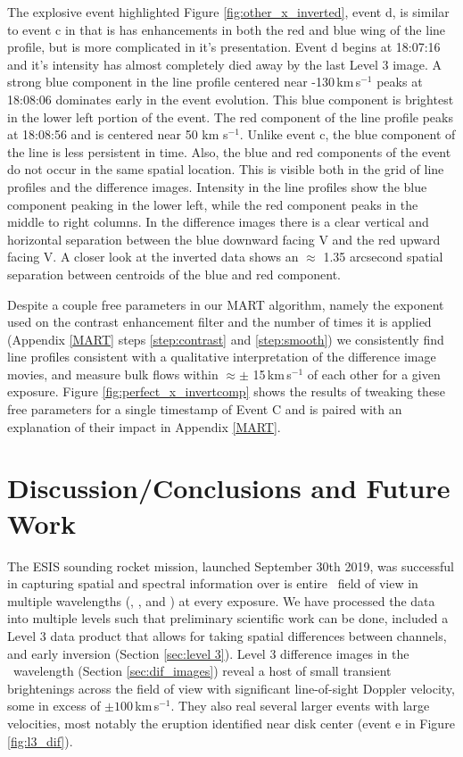 		The explosive event highlighted Figure \ref{fig:other_x_inverted}, event d, is similar to event c in that is has enhancements in both the red and blue wing of the line profile, but is more complicated in it's presentation.
		Event d  begins at 18:07:16 and it's intensity has almost completely died away by the last Level 3 image.
		A strong blue component in the line profile centered near -130\,km\,s$^{-1}$  peaks at 18:08:06 dominates early in the event evolution.
		This blue component is brightest in the lower left portion of the event.
		The red component of the line profile peaks at 18:08:56 and is centered near 50 km s$^{-1}$.
		Unlike event c, the blue component of the line is less persistent in time.
		Also, the blue and red components of the event do not occur in the same spatial location.
		This is visible both in the grid of line profiles and the difference images.
		Intensity in the line profiles show the blue component peaking in the lower left, while the red component peaks in the middle to right columns.
		In the difference images there is a clear vertical and horizontal separation between the blue downward facing V and the red upward facing V. 
		A closer look at the inverted data shows an $\approx$ 1.35 arcsecond spatial separation between centroids of the blue and red component.

		Despite a couple free parameters in our MART algorithm, namely the exponent used on the contrast enhancement filter and the number of times it is applied (Appendix \ref{MART} steps \ref{step:contrast} and \ref{step:smooth}) we consistently find line profiles consistent with a qualitative interpretation of the difference image movies, and measure bulk flows within $\approx\pm$ 15\,km\,s$^{-1}$ of each other for a given exposure.
		Figure \ref{fig:perfect_x_invertcomp} shows the results of tweaking these free parameters for a single timestamp of Event C and is paired with an explanation of their impact in Appendix \ref{MART}.
	    		   	

    	
\section{Discussion/Conclusions and Future Work}
	The ESIS sounding rocket mission, launched September 30th 2019, was successful in capturing spatial and spectral information over is entire \esisfov \ field of view in multiple wavelengths (\hei, \mgxbright, and \ov) at every exposure.
	We have processed the data into multiple levels such that preliminary scientific work can be done, included a Level 3 data product that allows for taking spatial differences between channels, and early inversion (Section \ref{sec:level 3}).
	Level 3 difference images in the \ov \ wavelength (Section \ref{sec:dif_images}) reveal a host of small transient brightenings across the field of view with significant line-of-sight Doppler velocity, some in excess of $\pm 100\,$km\,s$^{-1}$.
	They also real several larger events with large velocities, most notably the eruption identified near disk center (event e in Figure \ref{fig:l3_dif}).
	
